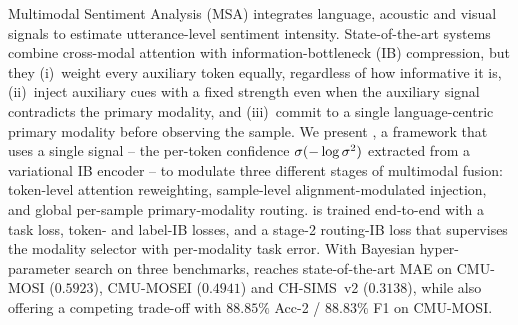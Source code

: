 Multimodal Sentiment Analysis (MSA) integrates language, acoustic and visual signals to estimate utterance-level sentiment intensity. State-of-the-art systems combine cross-modal attention with information-bottleneck (IB) compression, but they (i)~weight every auxiliary token equally, regardless of how informative it is, (ii)~inject auxiliary cues with a fixed strength even when the auxiliary signal contradicts the primary modality, and (iii)~commit to a single language-centric primary modality before observing the sample. We present \methodname, a framework that uses a single signal -- the per-token confidence $\sigma(-\log \sigma^{2})$ extracted from a variational IB encoder -- to modulate three different stages of multimodal fusion: token-level attention reweighting, sample-level alignment-modulated injection, and global per-sample primary-modality routing. \methodname{} is trained end-to-end with a task loss, token- and label-IB losses, and a stage-2 routing-IB loss that supervises the modality selector with per-modality task error. With Bayesian hyper-parameter search on three benchmarks, \methodname{} reaches state-of-the-art MAE on \textsc{CMU-MOSI} ($0.5923$), \textsc{CMU-MOSEI} ($0.4941$) and \textsc{CH-SIMS}~v2 ($0.3138$), while also offering a competing trade-off with $88.85\%$ Acc-2 / $88.83\%$ F1 on \textsc{CMU-MOSI}.
